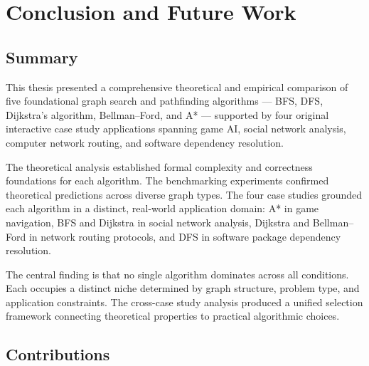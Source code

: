 \documentclass[12pt, a4paper, oneside]{report}
\theoremstyle{definition}
\begin{document}
\chapter{Conclusion and Future Work}

\section{Summary}

This thesis presented a comprehensive theoretical and empirical comparison of five foundational graph search and pathfinding algorithms — BFS, DFS, Dijkstra's algorithm, Bellman–Ford, and A* — supported by four original interactive case study applications spanning game AI, social network analysis, computer network routing, and software dependency resolution.

The theoretical analysis established formal complexity and correctness foundations for each algorithm. The benchmarking experiments confirmed theoretical predictions across diverse graph types. The four case studies grounded each algorithm in a distinct, real-world application domain: A* in game navigation, BFS and Dijkstra in social network analysis, Dijkstra and Bellman–Ford in network routing protocols, and DFS in software package dependency resolution.

The central finding is that no single algorithm dominates across all conditions. Each occupies a distinct niche determined by graph structure, problem type, and application constraints. The cross-case study analysis produced a unified selection framework connecting theoretical properties to practical algorithmic choices.

\section{Contributions}
\end{document}

